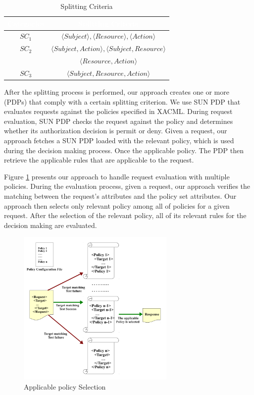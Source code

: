 \begin{table}[h!]
\centering
\setlength{\extrarowheight}{6 pt}
\begin{tabular}{|>{\small}c|>{\small}c|} 
\hline  \rowcolor{black} 
\bf
\textcolor{white}{Categories}& \bf \textcolor{white}{Splitting Criteria}\\ \hline
$SC_{1}$& {$\langle Subject \rangle, \langle Resource\rangle, \langle Action\rangle$}\\ \hline
$SC_{2}$& {$\langle Subject,Action \rangle, \langle Subject,Resource\rangle$}\\&{$\langle Resource,Action\rangle$}\\  \hline
$SC_{3}$& {$\langle Subject,Resource,Action\rangle$}\\ \hline
\end{tabular}
\caption{Splitting Criteria}
\label{table1}\end{table}



After the splitting process is performed, our approach creates one or more (PDPs) that comply with a certain splitting criterion.
We use SUN PDP \cite{sunxacml} that evaluates requests against the policies specified in XACML.
During request evaluation, SUN PDP checks the request against the policy and determines whether its authorization
decision is permit or deny. Given a request, our approach fetches a SUN PDP loaded with the relevant policy, which is used during the decision making process. Once the applicable policy. The PDP then retrieve the applicable rules that are applicable to the request.


Figure \ref{requestevaluation} presents our approach to handle request evaluation with multiple policies. 
During the evaluation process, given a request, our approach verifies the matching between the request's attributes
and the policy set attributes. Our approach then selects only relevant policy among all of policies for a given request.
After the selection of the relevant policy, all of its relevant rules for the decision making are evaluated.

\begin{figure}[!h]
\begin{center}
\includegraphics[width=3in, height=3in]{requestevaluation}
\caption{Applicable policy Selection}
\label{requestevaluation}
\end{center}
\end{figure}

